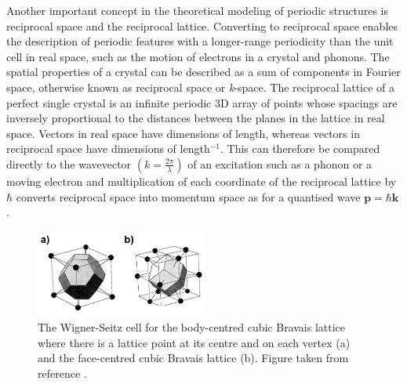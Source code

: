 \documentclass[11pt, twoside]{report}
\begin{document}
Another important concept in the theoretical modeling of periodic structures is reciprocal space and the reciprocal lattice. 
Converting to reciprocal space enables the description of periodic features with a longer-range periodicity than the unit cell in real space, such as the motion of electrons in a crystal and phonons.
The spatial properties of a crystal can be described as a sum of components in Fourier space, otherwise known as reciprocal space or \textit{k}-space. The reciprocal lattice of a perfect single crystal is an infinite periodic 3D array of points whose spacings are inversely proportional to the distances between the planes in the lattice in real space. Vectors in real space have dimensions of length, whereas vectors in reciprocal space have dimensions of length$^{-1}$. This can therefore be compared directly to the wavevector $ \left(k  = \frac{2\pi}{\lambda} \right)$ of an excitation such as a phonon or a moving electron and multiplication of each coordinate of the reciprocal lattice by $\hbar$ converts reciprocal space into momentum space as for a quantised wave $\mathbf{p} = \hbar \mathbf{k}$ \cite{Blakemore1}. 

\begin{figure}[h!]
  \centering
    \includegraphics[width=0.5\textwidth]{figures/Wigner-Seitz.png}
    \caption{The Wigner-Seitz cell for the body-centred cubic Bravais lattice where there is a lattice point at its centre and on each vertex (a) and the face-centred cubic Bravais lattice (b). 
    Figure taken from reference .}
  \label{Wigner-Seitz}
\end{figure}
\end{document}
